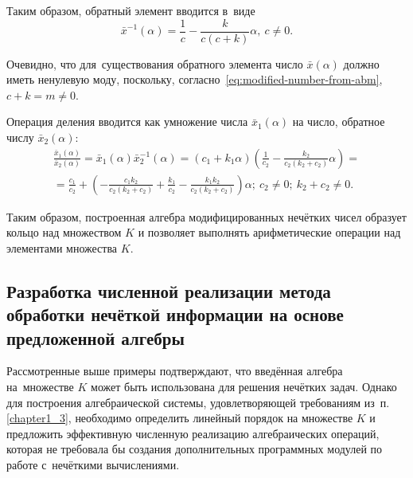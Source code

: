 Таким образом, обратный элемент вводится в~виде
\begin{equation}
\label{eq:modified-inverse-division}
  \bar{x}^{-1}(\alpha )=\frac{1}{c}-\frac{k}{c\left(c+k\right)}\alpha,\ c\ne 0.
\end{equation}

Очевидно, что для~существования обратного элемента число $\bar{x}\left( \alpha  \right)$ должно иметь ненулевую моду, поскольку, согласно~\eqref{eq:modified-number-from-abm}, $c+k=m\ne 0$.

Операция деления вводится как умножение числа $\bar{x}_1\left( \alpha  \right)$ на число, обратное числу $\bar{x}_2\left( \alpha  \right)$:
\begin{gather*}
  \frac{\bar{x}_1\left( \alpha \right)}{\bar{x}_2\left( \alpha  \right)}=\bar{x}_1\left( \alpha  \right)\bar{x}_{2}^{-1}\left( \alpha \right)=\left( c_1+k_1\alpha  \right)\left( \frac{1}{c_2}-\frac{k_2}{c_2\left( k_2+c_2 \right)}\alpha \right)={} \\ 
  {}=\frac{c_1}{c_2}+\left( -\frac{c_1k_2}{c_2\left( k_2+c_2 \right)}+\frac{k_1}{c_2}-\frac{k_1k_2}{c_2\left( k_2+c_2 \right)} \right)\alpha;\ c_2\ne 0;\ k_2+c_2\ne 0.
\end{gather*}

Таким образом, построенная алгебра модифицированных нечётких чисел образует кольцо над множеством $K$ и позволяет выполнять арифметические операции над элементами множества $K$.

\subsection{Разработка численной реализации метода обработки нечёткой информации на основе предложенной алгебры}

Рассмотренные выше примеры подтверждают, что введённая алгебра на~множестве $K$ может быть использована для решения нечётких задач. Однако для построения алгебраической системы, удовлетворяющей требованиям из~п.\ref{chapter1_3}, необходимо определить линейный порядок на множестве $K$ и предложить эффективную численную реализацию алгебраических операций, которая не требовала бы создания дополнительных программных модулей по работе с~нечёткими вычислениями. 


